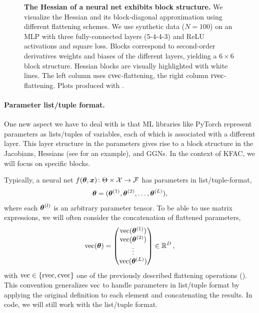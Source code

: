 \begin{figure}[!h]
\begin{minipage}[t]{0.495\linewidth}
  \end{minipage}
  \caption{\textbf{The Hessian of a neural net exhibits block structure.}
    We visualize the Hessian and its block-diagonal approximation using different flattening schemes.
    We use synthetic data ($N=100$) on an MLP with three fully-connected layers (5-4-4-3) and ReLU activations and square loss.
    Blocks correspond to second-order derivatives \wrt weights and biases of the different layers, yielding a $6 \times 6$ block structure.
    Hessian blocks are visually highlighted with white lines.
    The left column uses $\cvec$-flattening, the right column $\rvec$-flattening.
    Plots produced with .
  }\label{fig:hessian-block-structure}
\end{figure}
\switchcolumn[0]

\paragraph{Parameter list/tuple format.} One new aspect we have to deal with is that ML libraries like PyTorch represent parameters as lists/tuples of variables, each of which is associated with a different layer.
This layer structure in the parameters gives rise to a block structure in the Jacobians, Hessians (see  for an example), and GGNs.
In the context of KFAC, we will focus on specific blocks.

Typically, a neural net $f(\vtheta, \vx)\colon \Theta \times \gX \to \gF$ has parameters in list/tuple-format,
\begin{align*}
  \vtheta = (\vtheta^{(1)}, \vtheta^{(2)}, \ldots, \vtheta^{(L)}),
\end{align*}
where each $\vtheta^{(l)}$ is an arbitrary parameter tensor.
To be able to use matrix expressions, we will often consider the concatenation of flattened parameters,
\begin{align*}
  \vec(\vtheta)
  =
  \begin{pmatrix}
    \vec(\vtheta^{(1)}) \\
    \vec(\vtheta^{(2)}) \\
    \vdots              \\
    \vec(\vtheta^{(L)})
  \end{pmatrix}
  \in \sR^D
  \,,
\end{align*}
with $\vec \in \{ \rvec, \cvec \}$ one of the previously described flattening operations ().
This convention generalizes $\vec$ to handle parameters in list/tuple format by applying the original definition to each element and concatenating the results.
In code, we will still work with the list/tuple format.


